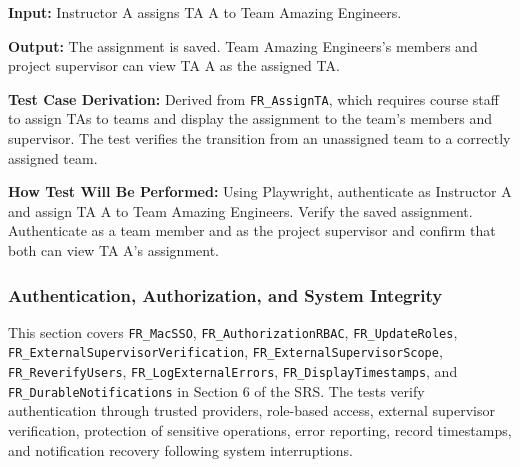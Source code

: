 \documentclass[12pt, titlepage]{article}
\begin{document}
\begin{enumerate}
\textbf{Input:} Instructor A assigns TA A to Team Amazing Engineers.

\textbf{Output:} The assignment is saved. Team Amazing Engineers's members and project supervisor can view TA A as the assigned TA.

\textbf{Test Case Derivation:} Derived from \texttt{FR\_AssignTA}, which requires course staff to assign TAs to teams and display the assignment to the team's members and supervisor. The test verifies the transition from an unassigned team to a correctly assigned team.

\textbf{How Test Will Be Performed:} Using Playwright, authenticate as Instructor A and assign TA A to Team Amazing Engineers. Verify the saved assignment. Authenticate as a team member and as the project supervisor and confirm that both can view TA A's assignment.

\end{enumerate}

\subsubsection{Authentication, Authorization, and System Integrity}

This section covers \texttt{FR\_MacSSO}, \texttt{FR\_AuthorizationRBAC}, \texttt{FR\_UpdateRoles}, \texttt{FR\_ExternalSupervisorVerification}, \texttt{FR\_ExternalSupervisorScope}, \texttt{FR\_ReverifyUsers}, \texttt{FR\_LogExternalErrors}, \texttt{FR\_DisplayTimestamps}, and \texttt{FR\_DurableNotifications} in Section 6 of the SRS. The tests verify authentication through trusted providers, role-based access, external supervisor verification, protection of sensitive operations, error reporting, record timestamps, and notification recovery following system interruptions.
\end{document}
